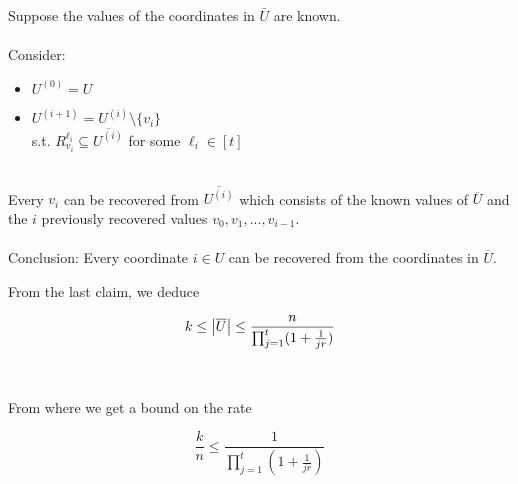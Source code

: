 \begin{frame}

    Suppose the values of the coordinates in $\bar{U}$ are known. \\~\\
    
    Consider:
    \begin{itemize}
        \item $U^{(0)} = U$
        \item $U^{(i+1)} = U^{(i)} \setminus \{v_{i}\}$ \\
         s.t. $R_{v_i}^{\ell_i} \subseteq \overline{U^{(i)}}$ for some $\ell_i \in [t]$ \\~\\
    \end{itemize}
    
    Every $v_i$ can be recovered from $\overline{U^{(i)}}$ which consists of the known values of $\overline{U}$ and the $i$ previously recovered values $v_0, v_1, ..., v_{i-1}$. \\~\\
    
    Conclusion: Every coordinate $i \in U$ can be recovered from the coordinates in $\overline{U}$.
\end{frame}

\begin{frame}
    From the last claim, we deduce
    
    $$ k \leq \left\vert {\overline{U}} \right\vert \leq \frac{n}{\prod_{j=1}^t (1 + \frac{1}{jr})}$$ \\~\\
    
    From where we get a bound on the rate
    
    $$\frac{k}{n} \leq \frac{1}{\prod_{j=1}^t (1 + \frac{1}{jr})}$$
    
    \qedsymbol
\end{frame}

\begin{frame}
    
\end{frame}